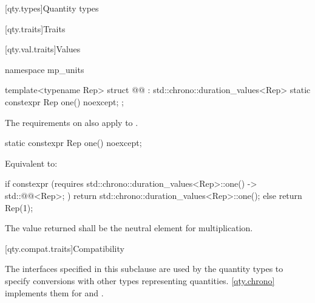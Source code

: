 [qty.types]{Quantity types}

[qty.traits]{Traits}

[qty.val.traits]{Values}

\begin{codeblock}
namespace mp_units {

template<typename Rep>
struct @@ : std::chrono::duration_values<Rep> {
  static constexpr Rep one() noexcept;
};

}
\end{codeblock}

\pnum
The requirements on 
also apply to .

\begin{itemdecl}
static constexpr Rep one() noexcept;
\end{itemdecl}

\begin{itemdescr}
\pnum
\effects
Equivalent to:
\begin{codeblock}
if constexpr (requires {
                { std::chrono::duration_values<Rep>::one() } -> std::@@<Rep>;
              })
  return std::chrono::duration_values<Rep>::one();
else
  return Rep(1);
\end{codeblock}

\pnum
\remarks
The value returned shall be the neutral element for multiplication.
\end{itemdescr}

[qty.compat.traits]{Compatibility}

\pnum
The interfaces specified in this subclause
are used by the quantity types
to specify conversions with other types representing quantities.
\ref{qty.chrono} implements them for  and .

